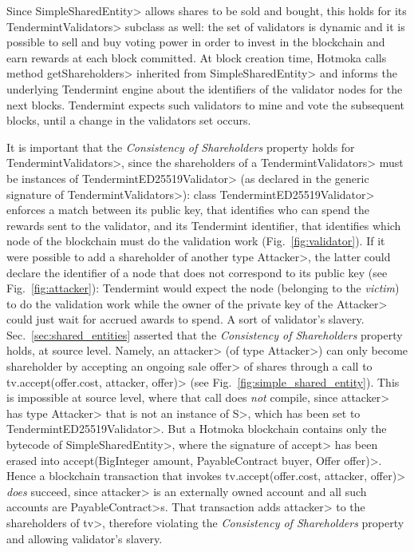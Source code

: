 Since \<SimpleSharedEntity> allows shares to be sold and bought, this holds for
its \<TendermintValidators> subclass as well: the set of validators
is dynamic and it is possible to sell and buy voting power in order to invest in the blockchain
and earn rewards at each block committed. At block creation time,
Hotmoka calls method \<getShareholders> inherited from
\<SimpleSharedEntity> and informs the
underlying Tendermint engine about the identifiers of the validator nodes for the next blocks.
Tendermint expects such validators to mine and vote the subsequent blocks, until a change in the
validators set occurs.

It is important that the \emph{Consistency of Shareholders} property holds
for \<TendermintValidators>, since
the shareholders of a \<TendermintValidators>
must be instances of \<TendermintED25519Validator> (as declared in the generic
signature of \<TendermintValidators>): class \<TendermintED25519Validator> enforces a
match between its public key, that identifies who can spend the rewards sent to the validator,
and its Tendermint identifier, that identifies which node of the blockchain
must do the validation work (Fig.~\ref{fig:validator}).
If it were possible to add a shareholder of another
type \<Attacker>, the latter could declare the identifier of a node that does not correspond to its
public key (see Fig.~\ref{fig:attacker}):
Tendermint would expect the node (belonging to the \emph{victim}) to do
the validation work while the owner
of the private key of the \<Attacker> could just wait for accrued awards to spend.
A sort of validator's slavery.
Sec.~\ref{sec:shared_entities} asserted that the \emph{Consistency of Shareholders}
property holds, at source level.
Namely, an \<attacker> (of type \<Attacker>) can only become shareholder
by accepting an ongoing sale \<offer> of shares through a call to
\<tv.accept(offer.cost, attacker, offer)> (see Fig.~\ref{fig:simple_shared_entity}).
This is impossible at source level, where that call does \emph{not} compile, since \<attacker> has type \<Attacker> that
is not an instance of \<S>, which has been set to \<TendermintED25519Validator>.
But a Hotmoka blockchain contains only the bytecode of \<SimpleSharedEntity>,
where the signature of \<accept> has been erased into
\<accept(BigInteger amount, PayableContract buyer, Offer offer)>.
Hence a blockchain transaction that invokes \<tv.accept(offer.cost, attacker, offer)>
\emph{does} succeed, since \<attacker> is an externally owned account and all such accounts
are \<PayableContract>s.
That transaction adds \<attacker> to the shareholders of \<tv>,
therefore violating the \emph{Consistency of Shareholders} property and allowing
validator's slavery.

